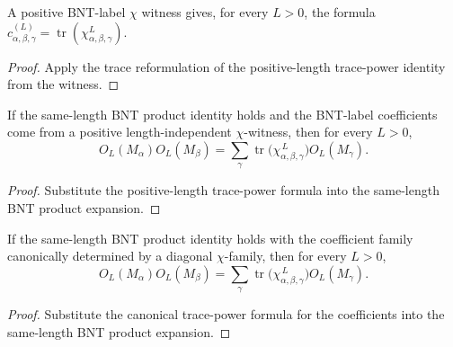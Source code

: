 \begin{theorem}%
    \label{thm:mpdo_positive_bnt_label_chi_eq_trace_matrix_pow}
    \leanok
    A positive BNT-label $\chi$ witness gives, for every $L>0$, the formula
    $c^{(L)}_{\alpha,\beta,\gamma}
        =\operatorname{tr}(\chi_{\alpha,\beta,\gamma}^{L})$.
\end{theorem}
\begin{proof}\leanok
    Apply the trace reformulation of the positive-length trace-power identity
    from the witness.
\end{proof}

\begin{theorem}%
    \label{thm:mpdo_bnt_label_same_length_product_eq_sum_chi_trace_pow}
    \leanok
    If the same-length BNT product identity holds and the BNT-label
    coefficients come from a positive length-independent $\chi$-witness, then
    for every $L>0$,
    \[
        O_L(M_\alpha)O_L(M_\beta)
        = \sum_\gamma
        \operatorname{tr}\bigl(    \chi_{\alpha,\beta,\gamma}^{\,L}
        \bigr) O_L(M_\gamma).
    \]
\end{theorem}
\begin{proof}\leanok
    Substitute the positive-length trace-power formula into the same-length BNT
    product expansion.
\end{proof}

\begin{theorem}%
    \label{thm:mpdo_bnt_label_same_length_product_eq_sum_of_chi_trace_pow}
    \leanok
    If the same-length BNT product identity holds with the coefficient family
    canonically determined by a diagonal $\chi$-family, then for every
    $L>0$,
    \[
        O_L(M_\alpha)O_L(M_\beta)
        = \sum_\gamma
        \operatorname{tr}\bigl(    \chi_{\alpha,\beta,\gamma}^{\,L}
        \bigr) O_L(M_\gamma).
    \]
\end{theorem}
\begin{proof}\leanok
    Substitute the canonical trace-power formula for the coefficients into the
    same-length BNT product expansion.
\end{proof}

